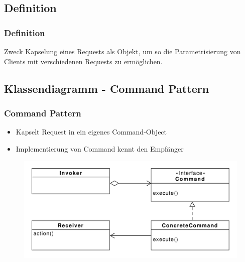 \subsection{Definition}
\begin{frame}
  \frametitle{Definition}
  \begin{block}{Zweck}
  	Kapselung eines Requests als Objekt, um so die Parametrisierung von Clients mit verschiedenen Requests zu ermöglichen.
  \end{block}
  
\end{frame}

\subsection{Klassendiagramm - Command Pattern}
\begin{frame}
	\frametitle{Command Pattern}		
	\begin{itemize}
		\item Kapselt Request in ein eigenes Command-Object
		\item Implementierung von Command kennt den Empfänger
	\end{itemize}	
  	\begin{figure}
		\includegraphics[scale=.4]{paper/command/command}
	\end{figure}
\end{frame}

